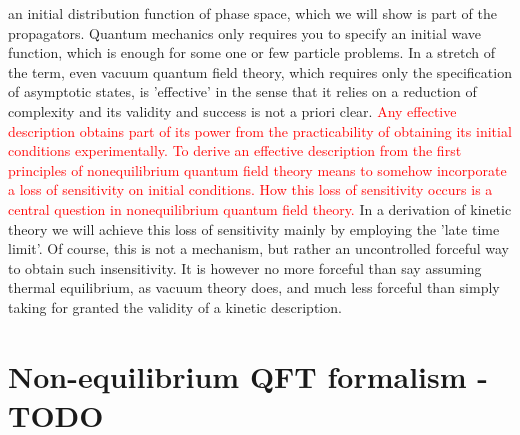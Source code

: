 an initial distribution function of phase space, which we will show is part of the propagators. Quantum
mechanics only requires you to specify an initial wave function, which is enough for some one or few
particle problems. In a stretch of the term, even vacuum quantum field theory, which requires only the
specification of asymptotic states, is ’effective’ in the sense that it relies on a reduction of complexity
and its validity and success is not a priori clear. \textcolor{red}{Any effective description obtains part of its power from
the practicability of obtaining its initial conditions experimentally. To derive an effective description
from the first principles of nonequilibrium quantum field theory means to somehow incorporate a loss of
sensitivity on initial conditions. How this loss of sensitivity occurs is a central question in nonequilibrium
quantum field theory.} In a derivation of kinetic theory we will achieve this loss of sensitivity mainly by
employing the ’late time limit’. Of course, this is not a mechanism, but rather an uncontrolled forceful
way to obtain such insensitivity. It is however no more forceful than say assuming thermal equilibrium,
as vacuum theory does, and much less forceful than simply taking for granted the validity of a kinetic
description.

\section{Non-equilibrium QFT formalism -  TODO}

